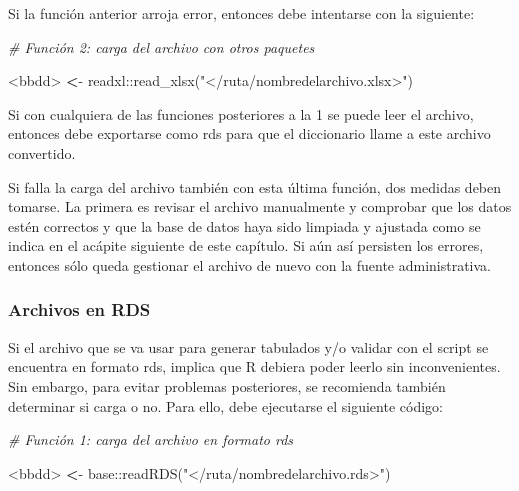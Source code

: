 \documentclass[
  spanish,
]{book}
\newenvironment{Shaded}{\begin{snugshade}}{\end{snugshade}}
\newcommand{\CommentTok}[1]{\textcolor[rgb]{0.56,0.35,0.01}{\textit{#1}}}
\newcommand{\ErrorTok}[1]{\textcolor[rgb]{0.64,0.00,0.00}{\textbf{#1}}}
\newcommand{\FunctionTok}[1]{\textcolor[rgb]{0.00,0.00,0.00}{#1}}
\newcommand{\NormalTok}[1]{#1}
\newcommand{\SpecialCharTok}[1]{\textcolor[rgb]{0.00,0.00,0.00}{#1}}
\newcommand{\StringTok}[1]{\textcolor[rgb]{0.31,0.60,0.02}{#1}}
\begin{document}
Si la función anterior arroja error, entonces debe intentarse con la siguiente:

\begin{Shaded}
\begin{Highlighting}[]
\CommentTok{\# Función 2: carga del archivo con otros paquetes}

\SpecialCharTok{\textless{}}\NormalTok{bbdd}\SpecialCharTok{\textgreater{}} \ErrorTok{\textless{}}\SpecialCharTok{{-}}\NormalTok{ readxl}\SpecialCharTok{::}\FunctionTok{read\_xlsx}\NormalTok{(}\StringTok{"\textless{}/ruta/nombredelarchivo.xlsx\textgreater{}"}\NormalTok{)}
\end{Highlighting}
\end{Shaded}

Si con cualquiera de las funciones posteriores a la 1 se puede leer el archivo, entonces debe exportarse como rds para que el diccionario llame a este archivo convertido.

Si falla la carga del archivo también con esta última función, dos medidas deben tomarse. La primera es revisar el archivo manualmente y comprobar que los datos estén correctos y que la base de datos haya sido limpiada y ajustada como se indica en el acápite siguiente de este capítulo. Si aún así persisten los errores, entonces sólo queda gestionar el archivo de nuevo con la fuente administrativa.

\hypertarget{archivos-en-rds}{%
\subsubsection{Archivos en RDS}\label{archivos-en-rds}}

Si el archivo que se va usar para generar tabulados y/o validar con el script se encuentra en formato rds, implica que R debiera poder leerlo sin inconvenientes. Sin embargo, para evitar problemas posteriores, se recomienda también determinar si carga o no. Para ello, debe ejecutarse el siguiente código:

\begin{Shaded}
\begin{Highlighting}[]
\CommentTok{\# Función 1: carga del archivo en formato rds }

\SpecialCharTok{\textless{}}\NormalTok{bbdd}\SpecialCharTok{\textgreater{}} \ErrorTok{\textless{}}\SpecialCharTok{{-}}\NormalTok{ base}\SpecialCharTok{::}\FunctionTok{readRDS}\NormalTok{(}\StringTok{"\textless{}/ruta/nombredelarchivo.rds\textgreater{}"}\NormalTok{)}
\end{Highlighting}
\end{Shaded}
\end{document}
